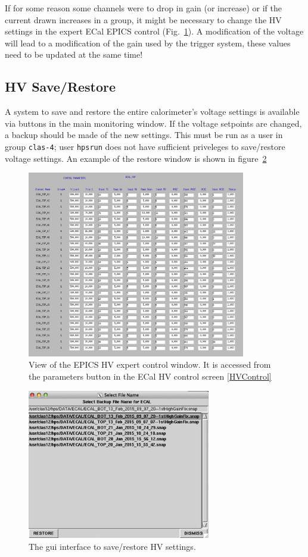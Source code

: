 \documentclass[12pt]{article}
\begin{document}
      If for some reason some channels were to drop in gain (or increase) or if the current drawn increases in a group, it might be necessary to change the HV settings in the expert ECal EPICS control (Fig.~\ref{EHV}). A modification of the voltage will lead to a modification of the gain used by the trigger system, these values need to be updated at the same time!
      \subsection{HV Save/Restore}
      A system to save and restore the entire calorimeter's voltage settings is available via buttons in the main monitoring window.  If the voltage setpoints are changed, a backup should be made of the new settings.  This must be run as a user in group \texttt{clas-4};  user \texttt{hpsrun} does not have sufficient priveleges to save/restore voltage settings. 
      An example of the restore window is shown in figure~\ref{fig:hvrestore}

\begin{figure}[htbp]
\center
\includegraphics[width=0.85\textwidth]{pics/ecalhv_parameters_2014_12_15.png}
\caption{\small \label{EHV} View of the EPICS HV expert control window. It is accessed from the parameters button in the ECal HV control screen \ref{HVControl}}
\end{figure}

\begin{figure}[htbp]\centering
    \includegraphics[width=8cm]{pics/hvrestore.png}
    \caption{The gui interface to save/restore HV settings.  \label{fig:hvrestore}}
\end{figure}
\end{document}
